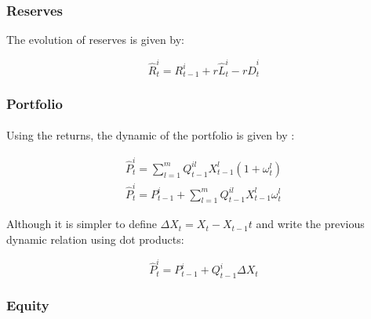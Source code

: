 \documentclass{article}
\newcommand{\wh}{\widehat}
\begin{document}
\subsubsection{Reserves}

The evolution of reserves is given by: 

\begin{equation}\label{eq:rsv}
\widehat{R}_t^i = R_{t-1}^i + r \wh L_t^i - r \wh D_t^i
\end{equation}



\subsubsection{Portfolio}

\paragraph{}
Using the returns, the dynamic of the portfolio is given by :

\begin{eqnarray*}
\widehat{P}_t^{i} = \sum_{l=1}^{m} Q_{t-1}^{il} X_{t-1}^l (1+\omega_t^l) \\
\widehat{P}_t^{i} = P_{t-1}^{i} + \sum_{l=1}^{m} Q_{t-1}^{il} X_{t-1}^l \omega_t^l
\end{eqnarray*}
     
Although it is simpler to define $\Delta X_t = X_t - X_{t-1}t$ and write the previous dynamic relation using dot products: 

\begin{equation}\label{eq:ptf}
\widehat{P}_t^{i} = P_{t-1}^{i} + Q_{t-1}^i\Delta X_t
\end{equation}


\subsubsection{Equity}
\end{document}
